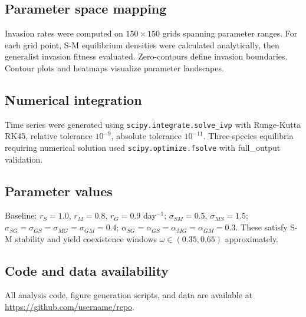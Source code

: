 \documentclass[9pt,twocolumn,twoside]{pnas-new}
\begin{document}
\subsection*{Parameter space mapping}
Invasion rates were computed on $150 \times 150$ grids spanning parameter ranges. For each grid point, S-M equilibrium densities were calculated analytically, then generalist invasion fitness evaluated. Zero-contours define invasion boundaries. Contour plots and heatmaps visualize parameter landscapes.

\subsection*{Numerical integration}
Time series were generated using \texttt{scipy.integrate.solve\_ivp} with Runge-Kutta RK45, relative tolerance $10^{-9}$, absolute tolerance $10^{-11}$. Three-species equilibria requiring numerical solution used \texttt{scipy.optimize.fsolve} with full\_output validation.

\subsection*{Parameter values}
Baseline: $r_S = 1.0$, $r_M = 0.8$, $r_G = 0.9$ day$^{-1}$; $\sigma_{SM} = 0.5$, $\sigma_{MS} = 1.5$; $\sigma_{SG} = \sigma_{GS} = \sigma_{MG} = \sigma_{GM} = 0.4$; $\alpha_{SG} = \alpha_{GS} = \alpha_{MG} = \alpha_{GM} = 0.3$. These satisfy S-M stability and yield coexistence windows $\omega \in (0.35, 0.65)$ approximately.

\subsection*{Code and data availability}
All analysis code, figure generation scripts, and data are available at \url{https://github.com/username/repo}.


\showacknow


\end{document}
